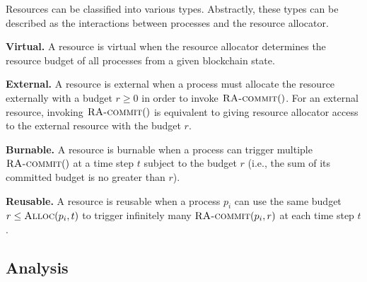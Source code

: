 \documentclass[12pt,draftcls,onecolumn]{IEEEtran}
\newcommand{\Alloc}{\textsc{Alloc}}
\begin{document}
Resources can be classified into various types. Abstractly, these types can be described as the interactions between processes and the resource allocator.

{\bf Virtual.} A resource is virtual when the resource allocator determines the resource budget of all processes from a given blockchain state.

{\bf External.} A resource is external when a process must allocate the resource externally with a budget $r \ge 0$ in order to invoke $\textsc{RA-commit}()$.
For an external resource, invoking $\textsc{RA-commit}()$ is equivalent to giving resource allocator access to the external resource with the budget $r$.

{\bf Burnable.} A resource is burnable when a process can trigger multiple $\textsc{RA-commit}()$ at a time step $t$ subject to the budget $r$ (i.e., the sum of its committed budget is no greater than $r$).

{\bf Reusable.} A resource is reusable when a process $p_i$ can use the same budget $r \le \Alloc(p_i, t)$ to trigger infinitely many $\textsc{RA-commit}(p_i, r)$ at each time step $t$.


\subsection{Analysis}
\end{document}

